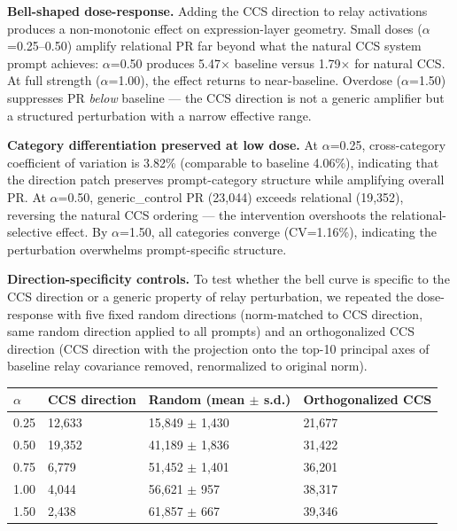 \documentclass[11pt]{article}
\begin{document}
\textbf{Bell-shaped dose-response.} Adding the CCS direction to relay activations produces a non-monotonic effect on expression-layer geometry. Small doses ($\alpha$=0.25–0.50) amplify relational PR far beyond what the natural CCS system prompt achieves: $\alpha$=0.50 produces 5.47$\times$ baseline versus 1.79$\times$ for natural CCS. At full strength ($\alpha$=1.00), the effect returns to near-baseline. Overdose ($\alpha$=1.50) suppresses PR \textit{below} baseline --- the CCS direction is not a generic amplifier but a structured perturbation with a narrow effective range.

\textbf{Category differentiation preserved at low dose.} At $\alpha$=0.25, cross-category coefficient of variation is 3.82\% (comparable to baseline 4.06\%), indicating that the direction patch preserves prompt-category structure while amplifying overall PR. At $\alpha$=0.50, generic\_control PR (23,044) exceeds relational (19,352), reversing the natural CCS ordering --- the intervention overshoots the relational-selective effect. By $\alpha$=1.50, all categories converge (CV=1.16\%), indicating the perturbation overwhelms prompt-specific structure.

\textbf{Direction-specificity controls.} To test whether the bell curve is specific to the CCS direction or a generic property of relay perturbation, we repeated the dose-response with five fixed random directions (norm-matched to CCS direction, same random direction applied to all prompts) and an orthogonalized CCS direction (CCS direction with the projection onto the top-10 principal axes of baseline relay covariance removed, renormalized to original norm).

\begin{table}[h]
\centering
\small
\begin{tabular}{|l|l|l|l|}
\hline
\textbf{$\alpha$} & \textbf{CCS direction} & \textbf{Random (mean $\pm$ s.d.)} & \textbf{Orthogonalized CCS} \\
\hline
0.25 & 12,633 & 15,849 $\pm$ 1,430 & 21,677 \\
0.50 & 19,352 & 41,189 $\pm$ 1,836 & 31,422 \\
0.75 & 6,779 & 51,452 $\pm$ 1,401 & 36,201 \\
1.00 & 4,044 & 56,621 $\pm$ 957 & 38,317 \\
1.50 & 2,438 & 61,857 $\pm$ 667 & 39,346 \\
\hline
\end{tabular}
\end{table}
\end{document}
